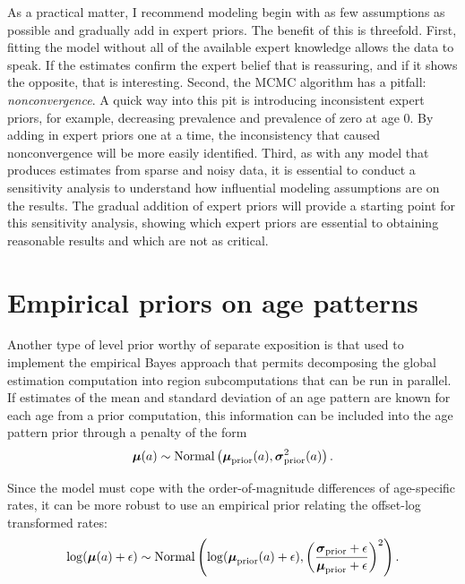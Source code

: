 As a practical matter, I recommend modeling begin with as few
assumptions as possible and gradually add in expert priors. The
benefit of this is threefold.  First, fitting the model without all of
the available expert knowledge allows the data to speak.  If the estimates
confirm the expert belief that is reassuring, and if it shows the
opposite, that is interesting. Second, the MCMC algorithm has a
pitfall: \emph{nonconvergence}. A quick way into this pit is
introducing inconsistent expert priors, for example, decreasing
prevalence and prevalence of zero at age $0$. By adding in expert
priors one at a time, the inconsistency that caused nonconvergence
will be more easily identified. Third, as with any model that produces
estimates from sparse and noisy data, it is essential to conduct a
sensitivity analysis to understand how influential modeling
assumptions are on the results.  The gradual addition of expert priors
will provide a starting point for this sensitivity analysis, showing
which expert priors are essential to obtaining reasonable results and
which are not as critical.

\section{Empirical priors on age patterns}
Another type of level prior worthy of separate exposition is that used
to implement the empirical Bayes approach that permits decomposing the
global estimation computation into region subcomputations that can be
run in parallel.  If estimates of the mean and standard deviation of
an age pattern are known for each age from a prior computation, this
information can be included into the age pattern prior through a
penalty of the form
\[
\boldsymbol{\mu}(a) \sim \operatorname{Normal}\left(\boldsymbol{\mu}_{\text{prior}}(a),
\boldsymbol{\sigma}_{\text{prior}}^2(a)\right).
\]

Since the model must cope with the order-of-magnitude differences of age-specific rates, it can be more robust to use an empirical prior relating the offset-log transformed rates:
\[
\log(\boldsymbol{\mu}(a)+\epsilon) \sim \operatorname{Normal}\left(\log(\boldsymbol{\mu}_{\text{prior}}(a)+\epsilon),
\left(\frac{\boldsymbol{\sigma}_{\text{prior}}+\epsilon}{\boldsymbol{\mu}_{\text{prior}}+\epsilon}\right)^2\right).
\]
